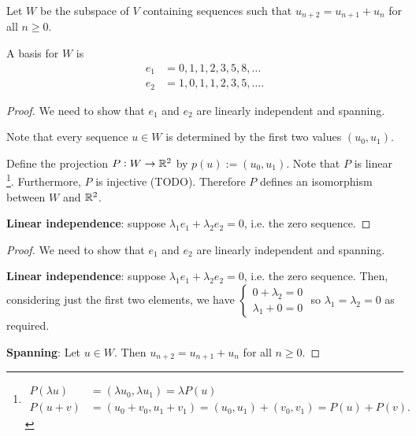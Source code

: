 \documentclass[12pt]{article}
\begin{document}
Let $W$ be the subspace of $V$ containing sequences such that $u_{n+2} = u_{n+1} + u_n$ for all
$n \geq 0$.

\begin{comment}
  \begin{proof}
    $W$ is a subspace because:
    \begin{enumerate}
    \item $W$ contains the zero sequence.
    \item Let $(u)_{n\geq 0}, (v)_{n\geq 0} \in W$. Then
      $$(u + v)_{n+2} = u_{n+1} + u_n + v_{n + 1} + v_n = (u + v)_{n+1} + (u + v)_n,$$ and
      $$(\lambda u)_{n+2} = \lambda u_{n+1} + \lambda u_n = (\lambda u)_{n+1} + (\lambda u)_n.$$
    \end{enumerate}
  \end{proof}
\end{comment}


\begin{claim*}
  A basis for $W$ is
  \begin{align*}
    e_1 &= 0, 1, 1, 2, 3, 5, 8, \ldots\\
    e_2 &= 1, 0, 1, 1, 2, 3, 5, \ldots.
  \end{align*}
\end{claim*}

\begin{proof} We need to show that $e_1$ and $e_2$ are linearly independent and spanning.

  Note that every sequence $u \in W$ is determined by the first two values $(u_0, u_1)$.

  Define the projection $P: W \to \mathbb{R}^2$ by $p(u) := (u_0, u_1)$. Note that $P$ is linear \footnote{
  \begin{align*}
    P(\lambda u) &= (\lambda u_0, \lambda u_1) = \lambda P(u)\\
    P(u + v)     &= (u_0 + v_0, u_1 + v_1) = (u_0, u_1) + (v_0, v_1) = P(u) + P(v).
  \end{align*}
  }.
  Furthermore, $P$ is injective (TODO). Therefore $P$ defines an isomorphism between $W$ and $\mathbb{R}^2$.

  {\bf Linear independence}: suppose $\lambda_1 e_1 + \lambda_2 e_2 = 0$, i.e. the zero
  sequence.


\end{proof}

\begin{proof}
  We need to show that $e_1$ and $e_2$ are linearly independent and spanning.

  {\bf Linear independence}: suppose $\lambda_1 e_1 + \lambda_2 e_2 = 0$, i.e. the zero
  sequence. Then, considering just the first two elements, we have $
  \begin{cases}
    0 + \lambda_2 = 0\\
    \lambda_1 + 0 = 0
  \end{cases}
$ so $\lambda_1 = \lambda_2 = 0$ as required.

  {\bf Spanning}: Let $u \in W$. Then $u_{n+2} = u_{n+1} + u_n$ for all $n \geq 0$.
\end{proof}


\end{document}
